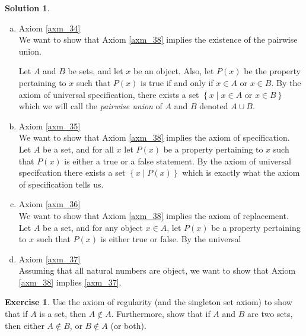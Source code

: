 \documentclass[a4paper, twocolumn]{report}
\newcounter{exercise} \numberwithin{exercise}{section}
\theoremstyle{definition}
\newtheorem{exc}[exercise]{Exercise}
\theoremstyle{solution}
\newtheorem*{sltn}{Solution}
\newcommand{\union}{\cup}
\begin{document}
\begin{sltn}
\begin{enumerate}[(a)]
    \item Axiom \ref{axm_34} \\
      [0.2cm]
      We want to show that Axiom \ref{axm_38} implies the existence of the pairwise union.

      Let $A$ and $B$ be sets, and let $x$ be an object. Also, let $P(x)$ be
      the property pertaining to $x$ such that $P(x)$ is true if and only if
      $x \in A$ or $x \in B$. By the axiom of universal specification, there
      exists a set $\left\{ x \mid x \in A \text{ or } x \in B \right\}$ which
      we will call the \textit{pairwise union} of $A$ and $B$ denoted $A \union
      B$.

    \item Axiom \ref{axm_35} \\
      [0.2cm]
      We want to show that Axiom \ref{axm_38} implies the axiom of
      specification.  Let $A$ be a set, and for all $x$ let $P(x)$ be a
      property pertaining to $x$ such that $P(x)$ is either a true or a false
      statement. By the axiom of universal specifcation there exists a set
      $\left\{ x \mid P(x) \right\}$ which is exactly what the axiom of
      specification tells us.

    \item Axiom \ref{axm_36}\\
      [0.2cm]
      We want to show that Axiom \ref{axm_38} implies the axiom of replacement.
      Let $A$ be a set, and for any object $x \in A$, let $P(x)$ be a property pertaining
      to $x$ such that $P(x)$ is either true or false. By the universal 

    \item Axiom \ref{axm_37}\\
    [0.2cm]
    Assuming that all natural numbers are object, we want to show that Axiom
    \ref{axm_38} implies \ref{axm_37}. 
  \end{enumerate}


\end{sltn}

\begin{exc}
  Use the axiom of regularity (and the singleton set axiom) to show that if $A$
  is a set, then $A \notin A$. Furthermore, show that if $A$ and $B$ are two
  sets, then either $A \notin B$, or $B \notin A$ (or both).
\end{exc}
\end{document}

